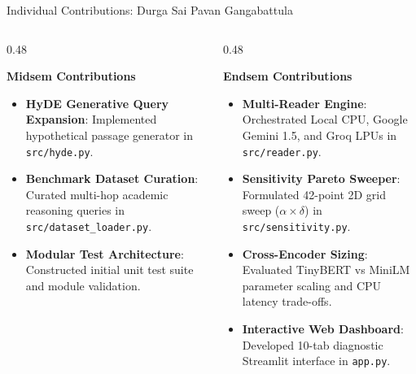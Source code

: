 \documentclass[10pt,aspectratio=169]{beamer}
\begin{document}
\begin{frame}{Individual Contributions: Durga Sai Pavan Gangabattula}
    \begin{columns}[onlytextwidth,T]
        \begin{column}{0.48\textwidth}
            \begin{block}{\textbf{Midsem Contributions}}
                \footnotesize
                \begin{itemize}\setlength\itemsep{3pt}
                    \item \textbf{HyDE Generative Query Expansion}: Implemented hypothetical passage generator in \texttt{src/hyde.py}.
                    \item \textbf{Benchmark Dataset Curation}: Curated multi-hop academic reasoning queries in \texttt{src/dataset\_loader.py}.
                    \item \textbf{Modular Test Architecture}: Constructed initial unit test suite and module validation.
                \end{itemize}
            \end{block}
        \end{column}
        
        \begin{column}{0.48\textwidth}
            \begin{block}{\textbf{Endsem Contributions}}
                \footnotesize
                \begin{itemize}\setlength\itemsep{3pt}
                    \item \textbf{Multi-Reader Engine}: Orchestrated Local CPU, Google Gemini 1.5, and Groq LPUs in \texttt{src/reader.py}.
                    \item \textbf{Sensitivity Pareto Sweeper}: Formulated 42-point 2D grid sweep ($\alpha \times \delta$) in \texttt{src/sensitivity.py}.
                    \item \textbf{Cross-Encoder Sizing}: Evaluated TinyBERT vs MiniLM parameter scaling and CPU latency trade-offs.
                    \item \textbf{Interactive Web Dashboard}: Developed 10-tab diagnostic Streamlit interface in \texttt{app.py}.
                \end{itemize}
            \end{block}
        \end{column}
    \end{columns}
\end{frame}
\end{document}
